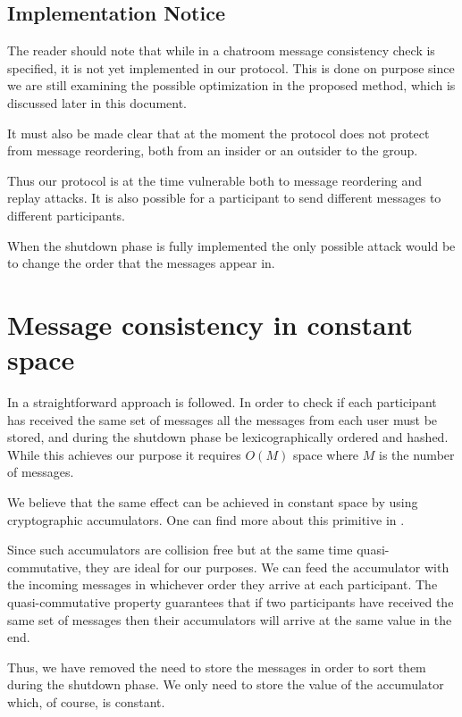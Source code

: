 \documentclass[12pt,titlepage,a4paper]{article}
\begin{document}
\subsection{Implementation Notice}

The reader should note that while in \cite{mpotr} a chatroom message consistency
check is specified, it is not yet implemented in our protocol. This is done on
purpose since we are still examining the possible optimization in the proposed
method, which is discussed later in this document.

It must also be made clear that at the moment the protocol does not protect
from message reordering, both from an insider or an outsider to the group.

Thus our protocol is at the time vulnerable both to message reordering and replay
attacks. It is also possible for a participant to send different messages to
different participants.

When the shutdown phase is fully implemented the only possible attack would be
to change the order that the messages appear in.

\section{Message consistency in constant space}

In \cite{mpotr} a straightforward approach is followed. In order to check if
each participant has received the same set of messages all the messages from
each user must be stored, and during the shutdown phase be lexicographically
ordered and hashed. While this achieves our purpose it requires $O(M)$ space
where $M$ is the number of messages.

We believe that the same effect can be achieved in constant space by using
cryptographic accumulators. One can find more about this primitive in \cite{accum_def}.

Since such accumulators are collision free but at the same time quasi-commutative,
they are ideal for our purposes. We can feed the accumulator with the incoming
messages in whichever order they arrive at each participant. The quasi-commutative
property guarantees that if two participants have received the same set of messages
then their accumulators will arrive at the same value in the end.

Thus, we have removed the need to store the messages in order to sort them during
the shutdown phase. We only need to store the value of the accumulator which,
of course, is constant.



\end{document}
